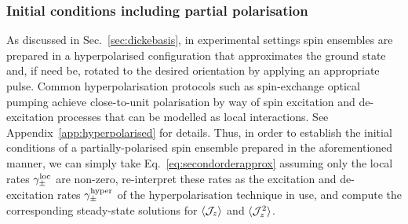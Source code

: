 \documentclass[aps,prd,10pt,twocolumn,superscriptaddress,floatfix,nofootinbib,amsmath,amssymb,altaffilletter,preprintnumbers]{revtex4-1}
\begin{document}
\subsubsection*{Initial conditions including partial polarisation}


As discussed in Sec.~\ref{sec:dickebasis}, in experimental settings spin ensembles are prepared in a hyperpolarised configuration that approximates the ground state and, if need be, rotated to the desired orientation by applying an appropriate pulse.  Common hyperpolarisation protocols such as spin-exchange optical pumping achieve close-to-unit polarisation by way of spin excitation and de-excitation processes that can be modelled as local interactions. See Appendix~\ref{app:hyperpolarised} for details.  Thus, in order to establish the initial conditions of a partially-polarised spin ensemble prepared in the aforementioned manner, 
we can simply take Eq.~\eqref{eq:secondorderapprox} assuming only the local rates $\gamma_\pm^{\rm loc}$ are non-zero, re-interpret these rates as the excitation and de-excitation rates $\gamma_\pm^{\rm hyper}$ of the hyperpolarisation technique in use, and compute the corresponding steady-state solutions for $\langle {\cal J}_z\rangle$ and $\langle {\cal J}_z^2 \rangle$.
\end{document}

